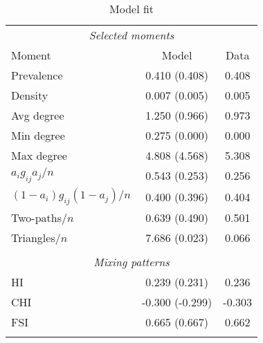 
\begin{table}[t]
\caption{Model fit}
\label{table:fit}
\begin{center}
\begin{tabular}{lcc}
\hline \hline
\multicolumn{3}{c}{\textit{Selected moments}} \\
    Moment & Model & Data \\ \hline 
              Prevalence & 0.410 (0.408) & 0.408  \\ 
                 Density & 0.007 (0.005) & 0.005  \\ 
              Avg degree & 1.250 (0.966) & 0.973  \\ 
              Min degree & 0.275 (0.000) & 0.000  \\ 
              Max degree & 4.808 (4.568) & 5.308  \\ 
        $a_ig_{ij}a_j/n$ & 0.543 (0.253) & 0.256  \\ 
$(1-a_i)g_{ij}(1-a_j)/n$ & 0.400 (0.396) & 0.404  \\ 
           Two-paths$/n$ & 0.639 (0.490) & 0.501  \\ 
           Triangles$/n$ & 7.686 (0.023) & 0.066  \\ 

\\
\multicolumn{3}{c}{\textit{Mixing patterns}} \\ 
                      HI & 0.239 (0.231) & 0.236  \\ 
                     CHI & -0.300 (-0.299) & -0.303  \\ 
                     FSI & 0.665 (0.667) & 0.662  \\ 

\hline \\
\end{tabular}
\end{center}

\end{table} 
